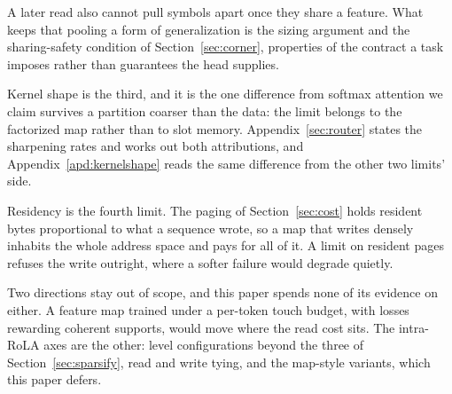 A later read also cannot pull symbols apart once they share a feature. What keeps that pooling a form of generalization is the sizing argument and the sharing-safety condition of Section~\ref{sec:corner}, properties of the contract a task imposes rather than guarantees the head supplies.

Kernel shape is the third, and it is the one difference from softmax attention we claim survives a partition coarser than the data: the limit belongs to the factorized map rather than to slot memory. Appendix~\ref{sec:router} states the sharpening rates and works out both attributions, and Appendix~\ref{apd:kernelshape} reads the same difference from the other two limits' side.

Residency is the fourth limit. The paging of Section~\ref{sec:cost} holds resident bytes proportional to what a sequence wrote, so a map that writes densely inhabits the whole address space and pays for all of it. A limit on resident pages refuses the write outright, where a softer failure would degrade quietly.

Two directions stay out of scope, and this paper spends none of its evidence on either. A feature map trained under a per-token touch budget, with losses rewarding coherent supports, would move where the read cost sits. The intra-RoLA axes are the other: level configurations beyond the three of Section~\ref{sec:sparsify}, read and write tying, and the map-style variants, which this paper defers.

